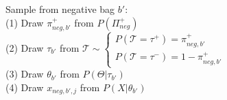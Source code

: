 Sample from negative bag $b'$:\\
(1) Draw $\pi^+_{neg,b'}$ from $P(\Pi^+_{neg})$ \\
(2) Draw $\tau_{b'}$ from $ \mathcal{T}  \sim \begin{cases}
    P(\mathcal{T} = \tau^+) = \pi_{neg,b'}^+\\
    P(\mathcal{T} = \tau^-)  = 1-\pi_{neg,b'}^+
  \end{cases} $ \\
(3) Draw $\theta_{b'}$ from $P(\Theta|\tau_{b'})$ \\
(4) Draw $x_{neg,b',j}$ from $P(X|\theta_{b'})$
 